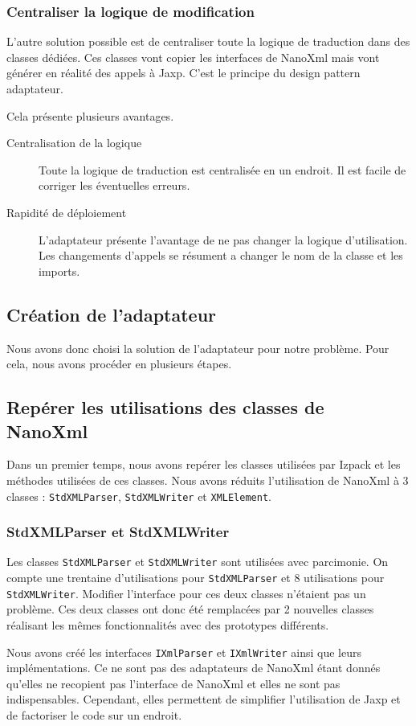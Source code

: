 \subsubsection{Centraliser la logique de modification}
L'autre solution possible est de centraliser toute la logique de traduction dans des classes dédiées.
Ces classes vont copier les interfaces de NanoXml mais vont générer en réalité des appels à Jaxp. 
C'est le principe du design pattern adaptateur.

Cela présente plusieurs avantages.
\begin{description}
\item[Centralisation de la logique] Toute la logique de traduction est centralisée en un endroit. Il est facile de corriger les éventuelles erreurs.
\item[Rapidité de déploiement] L'adaptateur présente l'avantage de ne pas changer la logique d'utilisation. Les changements d'appels se résument a changer le nom de la classe et les imports.
\end{description}
\subsection{Création de l'adaptateur}
Nous avons donc choisi la solution de l'adaptateur pour notre problème. Pour cela, nous avons procéder en plusieurs étapes.
\subsection{Repérer les utilisations des classes de NanoXml}
Dans un premier temps, nous avons repérer les classes utilisées par Izpack et les méthodes utilisées de ces classes.
Nous avons réduits l'utilisation de NanoXml à 3 classes : \verb|StdXMLParser|, \verb|StdXMLWriter| et \verb|XMLElement|.
\subsubsection{StdXMLParser et StdXMLWriter}
Les classes \verb|StdXMLParser| et \verb|StdXMLWriter| sont utilisées avec parcimonie.
On compte une trentaine d'utilisations pour \verb|StdXMLParser| et 8 utilisations pour \verb|StdXMLWriter|.
Modifier l'interface pour ces deux classes n'étaient pas un problème.
Ces deux classes ont donc été remplacées par 2 nouvelles classes réalisant les mêmes fonctionnalités avec des prototypes différents.

Nous avons créé les interfaces \verb|IXmlParser| et \verb|IXmlWriter| ainsi que leurs implémentations.
Ce ne sont pas des adaptateurs de NanoXml étant donnés qu'elles ne recopient pas l'interface de NanoXml et elles ne sont pas indispensables.
Cependant, elles permettent de simplifier l'utilisation de Jaxp et de factoriser le code sur un endroit.
